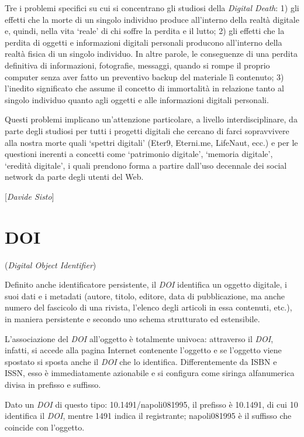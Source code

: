 Tre i problemi specifici su cui si concentrano gli studiosi della
\emph{Digital Death}: 1) gli effetti che la morte di un singolo
individuo produce all'interno della realtà digitale e, quindi, nella
vita `reale' di chi soffre la perdita e il lutto; 2) gli effetti che la
perdita di oggetti e informazioni digitali personali producono
all'interno della realtà fisica di un singolo individuo. In altre
parole, le conseguenze di una perdita definitiva di informazioni,
fotografie, messaggi, quando si rompe il proprio computer senza aver
fatto un preventivo backup del materiale lì contenuto; 3) l'inedito
significato che assume il concetto di immortalità in relazione tanto al
singolo individuo quanto agli oggetti e alle informazioni digitali
personali.

Questi problemi implicano un'attenzione particolare, a livello
interdisciplinare, da parte degli studiosi per tutti i progetti digitali
che cercano di farci sopravvivere alla nostra morte quali `spettri
digitali' (Eter9, Eterni.me, LifeNaut, ecc.) e per le questioni inerenti
a concetti come `patrimonio digitale', `memoria digitale', `eredità
digitale', i quali prendono forma a partire dall'uso decennale dei
social network da parte degli utenti del Web.

\hrulefill 

{[}\emph{Davide Sisto}{]}



\chapter{DOI}

(\emph{Digital Object Identifier})

Definito anche identificatore persistente, il \emph{DOI} identifica un
oggetto digitale, i suoi dati e i metadati (autore, titolo, editore,
data di pubblicazione, ma anche numero del fascicolo di una rivista,
l'elenco degli articoli in essa contenuti, etc.), in maniera persistente
e secondo uno schema strutturato ed estensibile.

L'associazione del \emph{DOI} all'oggetto è totalmente univoca:
attraverso il \emph{DOI}, infatti, si accede alla pagina Internet
contenente l'oggetto e se l'oggetto viene spostato si sposta anche il
\emph{DOI} che lo identifica. Differentemente da ISBN e ISSN, esso è
immediatamente azionabile e si configura come siringa alfanumerica
divisa in prefisso e suffisso.

Dato un \emph{DOI} di questo tipo: 10.1491/napoli081995, il prefisso è
10.1491, di cui 10 identifica il \emph{DOI}, mentre 1491 indica il
registrante; napoli081995 è il suffisso che coincide con l'oggetto.

